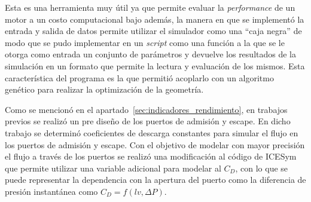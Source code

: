 Esta es una herramienta muy útil ya que permite evaluar la \emph{performance}
de un motor a un costo computacional bajo además, la manera en que se
implementó la entrada y salida de datos permite utilizar el simulador como una
``caja negra'' de modo que se pudo implementar en un \emph{script} como una
función a la que se le otorga como entrada un conjunto de parámetros y devuelve
los resultados de la simulación en un formato que permite la lectura y
evaluación de los mismos.
%
Esta característica del programa es la que permitió acoplarlo con un algoritmo
genético para realizar la optimización de la geometría.


Como se mencionó en el apartado~\ref{sec:indicadores_rendimiento}, en trabajos
previos se realizó un pre diseño de los puertos de admisión y escape.
%
En dicho trabajo se determinó coeficientes de descarga constantes
para simular el flujo en los puertos de admisión y escape.
%
Con el objetivo de modelar con mayor precisión el flujo a través de los puertos
se realizó una modificación al código de ICESym que permite utilizar una
variable adicional para modelar al $C_D$, con lo que se puede representar la
dependencia con la apertura del puerto como la diferencia de presión
instantánea como $C_D = f(lv, \Delta P)$.

